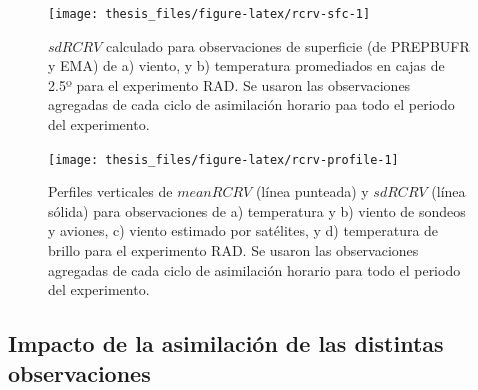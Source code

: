 \documentclass[12pt,oneside,a4paper]{reedthesis}
\begin{document}
\begin{figure}
\texttt{[image: thesis\_files/figure-latex/rcrv-sfc-1]} \caption{\(sd RCRV\) calculado para observaciones de superficie (de PREPBUFR y EMA) de a) viento, y b) temperatura promediados en cajas de 2.5º para el experimento RAD. Se usaron las observaciones agregadas de cada ciclo de asimilación horario paa todo el periodo del experimento.}\label{fig:rcrv-sfc}
\end{figure}

\begin{figure}
\texttt{[image: thesis\_files/figure-latex/rcrv-profile-1]} \caption{Perfiles verticales de \(mean RCRV\) (línea punteada) y \(sd RCRV\) (línea sólida) para observaciones de a) temperatura y b) viento de sondeos y aviones, c) viento estimado por satélites, y d) temperatura de brillo para el experimento RAD. Se usaron las observaciones agregadas de cada ciclo de asimilación horario para todo el periodo del experimento.}\label{fig:rcrv-profile}
\end{figure}
\hypertarget{impacto-analisis}{%
\subsection{Impacto de la asimilación de las distintas observaciones}\label{impacto-analisis}}
\end{document}
